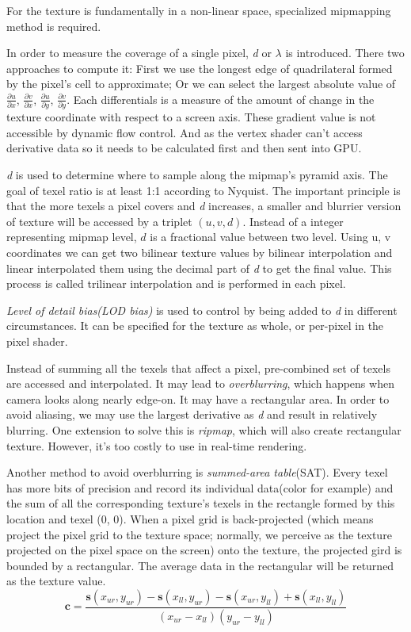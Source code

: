 \documentclass[10pt, a4paper]{article}
\begin{document}
    For the texture is fundamentally in a non-linear space, specialized mipmapping method is required. 

    In order to measure the coverage of a single pixel, \emph{d} or $\lambda$ is introduced. There two approaches to compute it: First we use the longest edge of quadrilateral formed by the pixel's cell to approximate; Or we can select the largest absolute value of $\frac{\partial u}{\partial x}$, $\frac{\partial v}{\partial x}$, $\frac{\partial u}{\partial y}$, $\frac{\partial v}{\partial y}$. Each differentials is a measure of the amount of change in the texture coordinate with respect to a screen axis. These gradient value is not accessible by dynamic flow control. And as the vertex shader can't access derivative data so it needs to be calculated first and then sent into GPU. 

    \emph{d} is used to determine where to sample along the mipmap's pyramid axis. The goal of texel ratio is at least 1:1 according to Nyquist. The important principle is that the more texels a pixel covers and \emph{d} increases, a smaller and blurrier version of texture will be accessed by a triplet $(u, v, d)$. Instead of a integer representing mipmap level, $d$ is a fractional value between two level. Using u, v coordinates we can get two bilinear texture values by bilinear interpolation and linear interpolated them using the decimal part of \emph{d} to get the final value. This process is called trilinear interpolation and is performed in each pixel. 

    \emph{Level of detail bias(LOD bias)} is used to control by being added to \emph{d} in different circumstances. It can be specified for the texture as whole, or per-pixel in the pixel shader. 

    Instead of summing all the texels that affect a pixel, pre-combined set of texels are accessed and interpolated. It may lead to \emph{overblurring}, which happens when camera looks along nearly edge-on. It may have a rectangular area. In order to avoid aliasing, we may use the largest derivative as \emph{d} and result in relatively blurring. One extension to solve this is \emph{ripmap}, which will also create rectangular texture. However, it's too costly to use in real-time rendering. 

    Another method to avoid overblurring is \emph{summed-area table}(SAT). Every texel has more bits of precision and record its individual data(color for example) and the sum of all the corresponding texture's texels in the rectangle formed by this location and texel (0, 0). When a pixel grid is back-projected (which means project the pixel grid to the texture space; normally, we perceive as the texture projected on the pixel space on the screen) onto the texture, the projected gird is bounded by a rectangular. The average data in the rectangular will be returned as the texture value. 
    $$\textbf{c} = \frac{\textbf{s}(x_{ur}, y_{ur}) - \textbf{s}(x_{ll}, y_{ur}) - \textbf{s}(x_{ur}, y_{ll}) + \textbf{s}(x_{ll}, y_{ll})}{(x_{ur} - x_{ll})(y_{ur} - y_{ll})}$$
\end{document}
